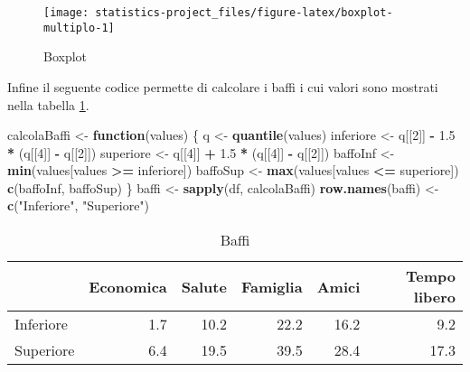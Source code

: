\documentclass[]{book}
\newenvironment{Shaded}{\begin{snugshade}}{\end{snugshade}}
\newcommand{\KeywordTok}[1]{\textcolor[rgb]{0.13,0.29,0.53}{\textbf{#1}}}
\newcommand{\DecValTok}[1]{\textcolor[rgb]{0.00,0.00,0.81}{#1}}
\newcommand{\FloatTok}[1]{\textcolor[rgb]{0.00,0.00,0.81}{#1}}
\newcommand{\StringTok}[1]{\textcolor[rgb]{0.31,0.60,0.02}{#1}}
\newcommand{\ControlFlowTok}[1]{\textcolor[rgb]{0.13,0.29,0.53}{\textbf{#1}}}
\newcommand{\OperatorTok}[1]{\textcolor[rgb]{0.81,0.36,0.00}{\textbf{#1}}}
\newcommand{\NormalTok}[1]{#1}
\begin{document}
\begin{figure}

{\centering \texttt{[image: statistics-project\_files/figure-latex/boxplot-multiplo-1]} 

}

\caption{Boxplot}\label{fig:boxplot-multiplo}
\end{figure}

Infine il seguente codice permette di calcolare i baffi i cui valori
sono mostrati nella tabella \ref{tab:baffi}.

\begin{Shaded}
\begin{Highlighting}[]
\NormalTok{calcolaBaffi <-}\StringTok{ }\ControlFlowTok{function}\NormalTok{(values) \{}
\NormalTok{  q <-}\StringTok{ }\KeywordTok{quantile}\NormalTok{(values)}
\NormalTok{  inferiore <-}\StringTok{ }\NormalTok{q[[}\DecValTok{2}\NormalTok{]] }\OperatorTok{-}\StringTok{ }\FloatTok{1.5} \OperatorTok{*}\StringTok{ }\NormalTok{(q[[}\DecValTok{4}\NormalTok{]] }\OperatorTok{-}\StringTok{ }\NormalTok{q[[}\DecValTok{2}\NormalTok{]])}
\NormalTok{  superiore <-}\StringTok{ }\NormalTok{q[[}\DecValTok{4}\NormalTok{]] }\OperatorTok{+}\StringTok{ }\FloatTok{1.5} \OperatorTok{*}\StringTok{ }\NormalTok{(q[[}\DecValTok{4}\NormalTok{]] }\OperatorTok{-}\StringTok{ }\NormalTok{q[[}\DecValTok{2}\NormalTok{]])}
\NormalTok{  baffoInf <-}\StringTok{ }\KeywordTok{min}\NormalTok{(values[values }\OperatorTok{>=}\StringTok{ }\NormalTok{inferiore])}
\NormalTok{  baffoSup <-}\StringTok{ }\KeywordTok{max}\NormalTok{(values[values }\OperatorTok{<=}\StringTok{ }\NormalTok{superiore])}
  \KeywordTok{c}\NormalTok{(baffoInf, baffoSup)  }
\NormalTok{\}}
\NormalTok{baffi <-}\StringTok{ }\KeywordTok{sapply}\NormalTok{(df, calcolaBaffi)}
\KeywordTok{row.names}\NormalTok{(baffi) <-}\StringTok{ }\KeywordTok{c}\NormalTok{(}\StringTok{"Inferiore"}\NormalTok{, }\StringTok{"Superiore"}\NormalTok{)}
\end{Highlighting}
\end{Shaded}

\begin{table}

\caption{\label{tab:baffi}Baffi}
\centering
\begin{tabular}[t]{l|r|r|r|r|r}
\hline
  & Economica & Salute & Famiglia & Amici & Tempo libero\\
\hline
Inferiore & 1.7 & 10.2 & 22.2 & 16.2 & 9.2\\
\hline
Superiore & 6.4 & 19.5 & 39.5 & 28.4 & 17.3\\
\hline
\end{tabular}
\end{table}
\end{document}
